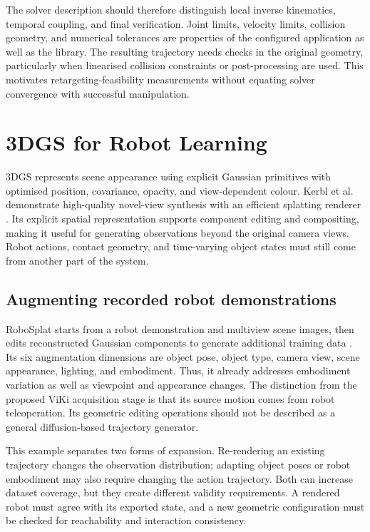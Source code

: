 The solver description should therefore distinguish local inverse kinematics,
temporal coupling, and final verification. Joint limits, velocity limits,
collision geometry, and numerical tolerances are properties of the configured
application as well as the library. The resulting trajectory needs checks in
the original geometry, particularly when linearised collision constraints or
post-processing are used. This motivates retargeting-feasibility measurements
without equating solver convergence with successful manipulation.

\section{3DGS for Robot Learning}
\label{sec:lit-3dgs}

3DGS represents scene appearance using explicit Gaussian
primitives with optimised position, covariance, opacity, and view-dependent
colour. Kerbl et al. demonstrate high-quality novel-view synthesis with an
efficient splatting renderer \cite{gaussiansplatting}. Its explicit spatial
representation supports component editing and compositing, making it useful
for generating observations beyond the original camera views. Robot actions,
contact geometry, and time-varying object states must still come from another
part of the system.

\subsection{Augmenting recorded robot demonstrations}

RoboSplat starts from a robot demonstration and multiview scene images, then
edits reconstructed Gaussian components to generate additional training data
\cite{robosplat}. Its six augmentation dimensions are object pose, object
type, camera view, scene appearance, lighting, and embodiment. Thus, it already
addresses embodiment variation as well as viewpoint and appearance changes.
The distinction from the proposed ViKi acquisition stage is that its source
motion comes from robot teleoperation. Its geometric editing operations should
not be described as a general diffusion-based trajectory generator.

This example separates two forms of expansion. Re-rendering an existing
trajectory changes the observation distribution; adapting object poses or
robot embodiment may also require changing the action trajectory. Both can
increase dataset coverage, but they create different validity requirements.
A rendered robot must agree with its exported state, and a new geometric
configuration must be checked for reachability and interaction consistency.

